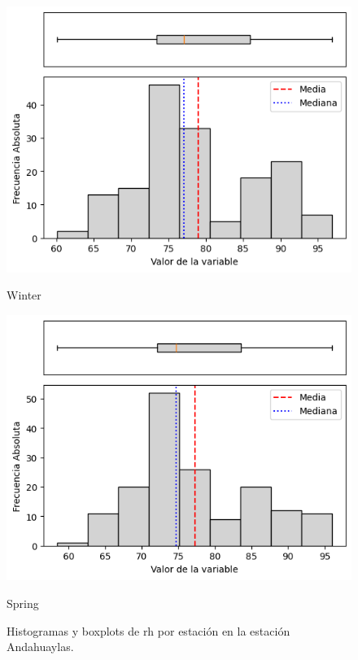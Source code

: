 \begin{figure}[htbp]
\vspace{0.2cm}

\begin{minipage}{0.30\textwidth}
  \includegraphics[width=\linewidth]{resultados/por_estacion_del_anio/boxplot_clases_por_estacion/Andahuaylas/RH_HistBoxplot_Winter.png}
  \caption*{Winter}
\end{minipage}
\hfill
\begin{minipage}{0.30\textwidth}
  \includegraphics[width=\linewidth]{resultados/por_estacion_del_anio/boxplot_clases_por_estacion/Andahuaylas/RH_HistBoxplot_Spring.png}
  \caption*{Spring}
\end{minipage}
\caption{Histogramas y boxplots de \gls{rh}  por estación en la estación Andahuaylas.}
\label{fig:andahuaylas_rh_hist}
\end{figure}

